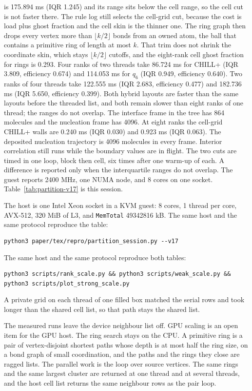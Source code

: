 \documentclass[preprint,12pt]{elsarticle}
\begin{document}
is 175.894 ms (IQR 1.245) and its range sits below the cell range, so the cell cut is not faster there. The rule log still selects the cell-grid cut, because the cost is load plus ghost fraction and the cell skin is the thinner one. The ring graph then drops every vertex more than $\lfloor k/2\rfloor$ bonds from an owned atom, the ball that contains a primitive ring of length at most $k$. That trim does not shrink the coordinate skin, which stays $\lfloor k/2\rfloor$ cutoffs, and the eight-rank cell ghost fraction for rings is 0.293. Four ranks of two threads take 86.724 ms for CHILL+ (IQR 3.809, efficiency 0.674) and 114.053 ms for $q_6$ (IQR 0.949, efficiency 0.640). Two ranks of four threads take 122.555 ms (IQR 2.683, efficiency 0.477) and 182.736 ms (IQR 5.650, efficiency 0.399). Both hybrid layouts are faster than the same layouts before the threaded list, and both remain slower than eight ranks of one thread; the ranges do not overlap. The interface frame in the tree has 864 molecules and the nucleation frame has 4096. At eight ranks the cell-grid CHILL+ walls are 0.240 ms (IQR 0.030) and 0.923 ms (IQR 0.063). The deposited nucleation trajectory is 4096 molecules in every frame. Interior correlation still runs while the boundary values are in flight. The two cuts are timed in one loop, block then cell, six times after one warm-up of each. A difference is reported only when the interquartile ranges do not overlap. The guest reports 2400 MHz, one NUMA node, and 8 cores on one socket. Table~\ref{tab:partition-v17} is this session.



The host is one Intel Xeon socket in a KVM guest: 8 cores, 1 thread per core, AVX-512, 320 MiB of L3, and \texttt{MemTotal} 49342816 kB. The same host and the same protocol reproduce the table:
\begin{verbatim}
python3 paper/tex/repro/partition_session.py --v17
\end{verbatim}

The same host and the same protocol reproduce both tables:
\begin{verbatim}
python3 scripts/rank_scale.py && python3 scripts/weak_scale.py && python3 scripts/plot_strong_scale.py
\end{verbatim}
A private grid on each thread of one filled box matched the serial rows and took longer than the shared cell list, so that path stays the shared list.

The measured runs leave the device neighbour list off.
GPU scaling is an open item for the GPU host.
The ring search stays on the CPU.
A primitive ring is a pair of vertex-disjoint shortest paths whose depth is at most half the ring size, on a bond graph of small coordination, and the paths and the rings they close are ragged lists.
The parallel work is the loop over source vertices.
The same rings and the same largest cluster are returned at one thread and at several threads, and the host cell list returns the same neighbour rows as the pair loop.
\end{document}
